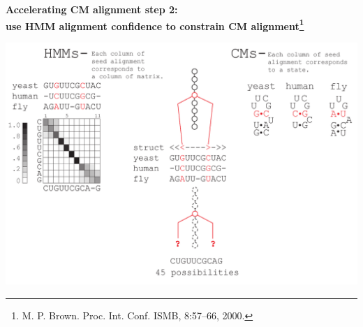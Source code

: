 \documentclass[landscape]{slides}
\begin{document}
\begin{slide}
\begin{slide}
\vfill
\end{slide}
\begin{slide}
\begin{center}

\textbf{Accelerating CM alignment step 2: \\ use HMM alignment
  confidence to constrain CM alignment\footnote{M. P. Brown. Proc. Int. Conf. ISMB, 8:57–66, 2000.}}
\end{center}
\medskip
\small
\begin{center}
\includegraphics[width=8in]{figs/post_hmm_to_cm_map2_layer14}
\end{center}
\vfill
\end{slide}
\begin{slide}
\begin{center}


\end{center}
\end{slide}
\end{slide}
\end{document}
